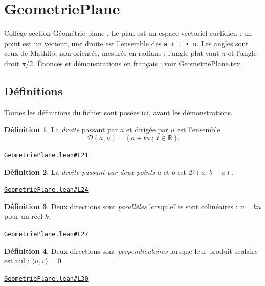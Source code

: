 \documentclass[11pt,a4paper]{article}
\theoremstyle{definition}
\newtheorem{definition}{Définition}
\theoremstyle{plain}
\newcommand{\source}[2]{\par\smallskip\noindent\hfill{\footnotesize\href{#1}{\texttt{#2}}}\par\smallskip}
\begin{document}
\section{GeometriePlane}

\noindent
Collège \textemdash{} section \og{} Géométrie plane \fg{}.
Le plan est un espace vectoriel euclidien : un point est un vecteur, une droite est
l'ensemble des \texttt{a + t • u}. Les angles sont ceux de Mathlib, non orientés, mesurés en
radians : l'angle plat vaut \(\pi\) et l'angle droit \(\pi\)/2.
Énoncés et démonstrations en français : voir GeometriePlane.tex.

\subsection{Définitions}

\noindent
Toutes les définitions du fichier sont posées ici, avant les démonstrations.

\begin{definition}
La \emph{droite} passant par $a$ et dirigée par $u$ est l'ensemble
\[ \mathcal{D}(a, u) = \{\, a + tu \ ;\ t \in \mathbb{R} \,\} . \]
\end{definition}
\source{https://github.com/Commutator-IO/learn-lean/blob/main/cours/01-college/02-geometrie-plane/GeometriePlane.lean\#L21}{GeometriePlane.lean\#L21}

\begin{definition}
La \emph{droite passant par deux points} $a$ et $b$ est $\mathcal{D}(a,\, b - a)$.
\end{definition}
\source{https://github.com/Commutator-IO/learn-lean/blob/main/cours/01-college/02-geometrie-plane/GeometriePlane.lean\#L24}{GeometriePlane.lean\#L24}

\begin{definition}
Deux directions sont \emph{parallèles} lorsqu'elles sont colinéaires : $v = ku$ pour un
réel $k$.
\end{definition}
\source{https://github.com/Commutator-IO/learn-lean/blob/main/cours/01-college/02-geometrie-plane/GeometriePlane.lean\#L27}{GeometriePlane.lean\#L27}

\begin{definition}
Deux directions sont \emph{perpendiculaires} lorsque leur produit scalaire est nul :
$\langle u, v\rangle = 0$.
\end{definition}
\source{https://github.com/Commutator-IO/learn-lean/blob/main/cours/01-college/02-geometrie-plane/GeometriePlane.lean\#L30}{GeometriePlane.lean\#L30}
\end{document}
